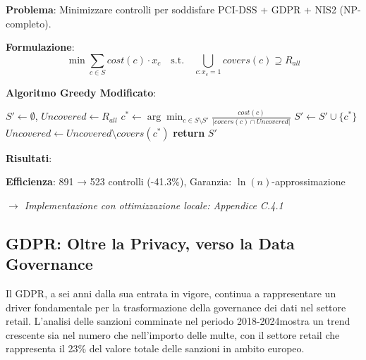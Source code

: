\begin{tcolorbox}[
    colback=yellow!5!white,
    colframe=yellow!75!black,
    title={\textbf{Innovation Box 4.1:} Algoritmo Set-Covering per Compliance Multi-Framework},
    fonttitle=\bfseries,
    boxrule=1.5pt,
    arc=2mm,
    breakable
]
\textbf{Problema}: Minimizzare controlli per soddisfare PCI-DSS + GDPR + NIS2 (NP-completo).

\vspace{0.3cm}
\textbf{Formulazione}:
\begin{equation*}
\min \sum_{c \in S} cost(c) \cdot x_c \quad \text{s.t.} \quad \bigcup_{c: x_c=1} covers(c) \supseteq R_{all}
\end{equation*}

\vspace{0.3cm}
\textbf{Algoritmo Greedy Modificato}:
\begin{algorithmic}[1]
\State $S' \gets \emptyset$, $Uncovered \gets R_{all}$
    \State $c^* \gets \arg\min_{c \in S \setminus S'} \frac{cost(c)}{|covers(c) \cap Uncovered|}$
    \State $S' \gets S' \cup \{c^*\}$
    \State $Uncovered \gets Uncovered \setminus covers(c^*)$
\EndWhile
\State \textbf{return} $S'$
\end{algorithmic}

\vspace{0.3cm}
\textbf{Risultati}:
\begin{center}
\end{center}

\textbf{Efficienza}: 891 → 523 controlli (-41.3\%), Garanzia: $\ln(n)$-approssimazione

\textit{$\rightarrow$ Implementazione con ottimizzazione locale: Appendice C.4.1}
\end{tcolorbox}

\subsection{GDPR: Oltre la Privacy, verso la Data Governance}

Il GDPR, a sei anni dalla sua entrata in vigore, continua a rappresentare un driver fondamentale per la trasformazione della governance dei dati nel settore retail. L'analisi delle sanzioni comminate nel periodo 2018-2024\footnotemark[4] mostra un trend crescente sia nel numero che nell'importo delle multe, con il settore retail che rappresenta il 23\% del valore totale delle sanzioni in ambito europeo.

